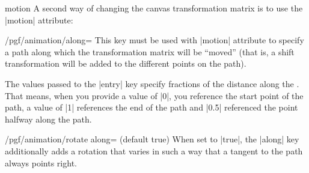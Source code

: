 \begin{animateattribute}{motion}
  A second way of changing the canvas transformation matrix is to use
  the |motion| attribute:
\begin{codeexample}[animation list={0.5,1,1.5,2}]
\end{codeexample}


\begin{key}{/pgf/animation/along=}
  This key must be used with |motion| attribute to
  specify a path along which the transformation matrix will be
  ``moved'' (that is, a shift transformation will be added to the
  different points on the path).

  The values passed to the |entry| key specify fractions of the
  distance along the . That means, when you provide a value
  of |0|, you reference the start point of the path, a value of |1|
  references the end of the path and |0.5| referenced the point
  halfway along the path.

\begin{codeexample}[animation list={0.25,0.5,0.75,1,1.25,1.5,1.75,2,2.25,2.5}]
\end{codeexample}
\end{key}

  
\begin{key}{/pgf/animation/rotate along= (default true)}
  When set to |true|, the |along| key additionally adds a rotation
  that varies in such a way that a tangent to the path always points right. 

\begin{codeexample}[animation list={0.5,1,1.5,2}]
\end{codeexample}  
\end{key}
\end{animateattribute}

